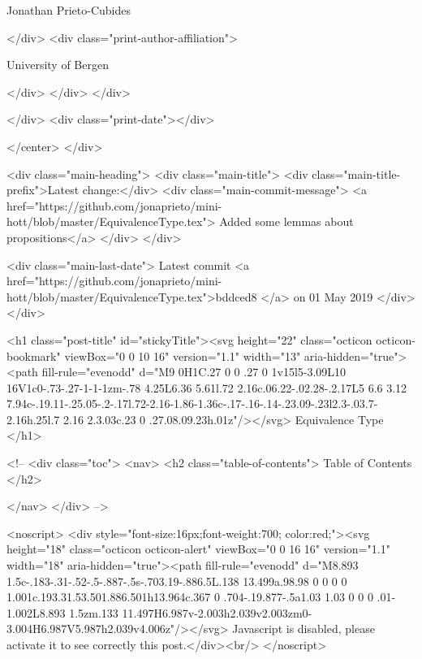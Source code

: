                   Jonathan Prieto-Cubides
                
              </div>
              <div class="print-author-affiliation">
                
                  University of Bergen
                
                </div>
            </div>
          </div>
          
          
        </div>
        <div class="print-date"></div>
        
        
    </center>
  </div>

  
  <div class="main-heading">
    <div class="main-title">
      <div class="main-title-prefix">Latest change:</div>
      <div class="main-commit-message">
            <a href="https://github.com/jonaprieto/mini-hott/blob/master/EquivalenceType.tex">
              Added some lemmas about propositions</a>
      </div>
    </div>

    <div class="main-last-date">
      Latest commit <a href="https://github.com/jonaprieto/mini-hott/blob/master/EquivalenceType.tex">bddced8 </a> on  01 May 2019
    </div>
  </div>
  
  <h1 class="post-title" id="stickyTitle"><svg height="22" class="octicon octicon-bookmark" viewBox="0 0 10 16" version="1.1" width="13" aria-hidden="true"><path fill-rule="evenodd" d="M9 0H1C.27 0 0 .27 0 1v15l5-3.09L10 16V1c0-.73-.27-1-1-1zm-.78 4.25L6.36 5.61l.72 2.16c.06.22-.02.28-.2.17L5 6.6 3.12 7.94c-.19.11-.25.05-.2-.17l.72-2.16-1.86-1.36c-.17-.16-.14-.23.09-.23l2.3-.03.7-2.16h.25l.7 2.16 2.3.03c.23 0 .27.08.09.23h.01z"/></svg> Equivalence Type
  </h1>

  <!-- 
  <div class="toc">
    <nav>
    <h2 class="table-of-contents"> Table of Contents </h2>
      

    </nav>
  </div>
   -->

  <noscript>
  <div style="font-size:16px;font-weight:700; color:red;"><svg height="18" class="octicon octicon-alert" viewBox="0 0 16 16" version="1.1" width="18" aria-hidden="true"><path fill-rule="evenodd" d="M8.893 1.5c-.183-.31-.52-.5-.887-.5s-.703.19-.886.5L.138 13.499a.98.98 0 0 0 0 1.001c.193.31.53.501.886.501h13.964c.367 0 .704-.19.877-.5a1.03 1.03 0 0 0 .01-1.002L8.893 1.5zm.133 11.497H6.987v-2.003h2.039v2.003zm0-3.004H6.987V5.987h2.039v4.006z"/></svg> Javascript is disabled, please activate it to see correctly this post.</div><br/>
  </noscript>

